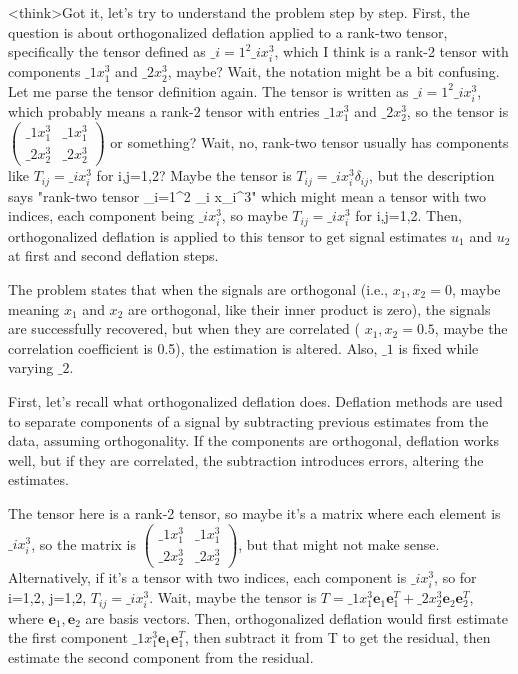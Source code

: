 <think>Got it, let's try to understand the problem step by step. First, the question is about orthogonalized deflation applied to a rank-two tensor, specifically the tensor defined as \( \_i=1^2 \_i x_i^3 \), which I think is a rank-2 tensor with components \( \_1 x_1^3 \) and \( \_2 x_2^3 \), maybe? Wait, the notation might be a bit confusing. Let me parse the tensor definition again. The tensor is written as \( \_i=1^2 \_i x_i^3 \), which probably means a rank-2 tensor with entries \( \_1 x_1^3 \) and \( \_2 x_2^3 \), so the tensor is \( \begin{pmatrix} \_1 x_1^3 & \_1 x_1^3 \\ \_2 x_2^3 & \_2 x_2^3 \end{pmatrix} \) or something? Wait, no, rank-two tensor usually has components like \( T_{ij} = \_i x_i^3 \) for i,j=1,2? Maybe the tensor is \( T_{ij} = \_i x_i^3 \delta_{ij} \), but the description says "rank-two tensor _i=1^2 _i x_i^3" which might mean a tensor with two indices, each component being \( \_i x_i^3 \), so maybe \( T_{ij} = \_i x_i^3 \) for i,j=1,2. Then, orthogonalized deflation is applied to this tensor to get signal estimates \( u_1 \) and \( u_2 \) at first and second deflation steps.

The problem states that when the signals are orthogonal (i.e., \( x_1, x_2 = 0 \), maybe meaning \( x_1 \) and \( x_2 \) are orthogonal, like their inner product is zero), the signals are successfully recovered, but when they are correlated ( \( x_1, x_2 = 0.5 \), maybe the correlation coefficient is 0.5), the estimation is altered. Also, \( \_1 \) is fixed while varying \( \_2 \).

First, let's recall what orthogonalized deflation does. Deflation methods are used to separate components of a signal by subtracting previous estimates from the data, assuming orthogonality. If the components are orthogonal, deflation works well, but if they are correlated, the subtraction introduces errors, altering the estimates.

The tensor here is a rank-2 tensor, so maybe it's a matrix where each element is \( \_i x_i^3 \), so the matrix is \( \begin{pmatrix} \_1 x_1^3 & \_1 x_1^3 \\ \_2 x_2^3 & \_2 x_2^3 \end{pmatrix} \), but that might not make sense. Alternatively, if it's a tensor with two indices, each component is \( \_i x_i^3 \), so for i=1,2, j=1,2, \( T_{ij} = \_i x_i^3 \). Wait, maybe the tensor is \( T = \_1 x_1^3 \mathbf{e}_1 \mathbf{e}_1^T + \_2 x_2^3 \mathbf{e}_2 \mathbf{e}_2^T \), where \( \mathbf{e}_1, \mathbf{e}_2 \) are basis vectors. Then, orthogonalized deflation would first estimate the first component \( \_1 x_1^3 \mathbf{e}_1 \mathbf{e}_1^T \), then subtract it from T to get the residual, then estimate the second component from the residual.

